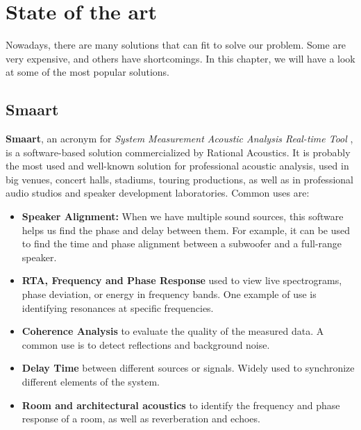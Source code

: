 \chapter{State of the art}

Nowadays, there are many solutions that can fit to solve our problem. Some are very expensive, and others have shortcomings. In this chapter, we will have a look at some of the most popular solutions.

\section{Smaart}

\textbf{Smaart}, an acronym for \textit{System Measurement Acoustic Analysis Real-time Tool} \cite{SMAART}, is a software-based solution commercialized by Rational Acoustics. It is probably the most used and well-known solution for professional acoustic analysis, used in big venues, concert halls, stadiums, touring productions, as well as in professional audio studios and speaker development laboratories.  Common uses are:


\begin{itemize}
	\item \textbf{Speaker Alignment:} When we have multiple sound sources, this software helps us find the phase and delay between them. For example, it can be used to find the time and phase alignment between a subwoofer and a full-range speaker.
	
	\item \textbf{RTA, Frequency and Phase Response} used to view live spectrograms, phase deviation, or energy in frequency bands. One example of use is identifying resonances at specific frequencies.

	\item \textbf{Coherence Analysis} to evaluate the quality of the measured data. A common use is to detect reflections and background noise.
	
	\item \textbf{Delay Time} between different sources or signals. Widely used to synchronize different elements of the system.
	
	\item \textbf{Room and architectural acoustics} to identify the frequency and phase response of a room, as well as reverberation and echoes.
\end{itemize}
	
